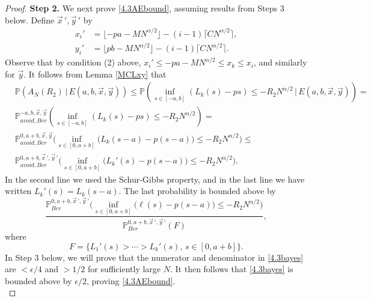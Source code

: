 \begin{proof}
		\noindent\textbf{Step 2.} We next prove \eqref{4.3AEbound}, assuming results from Steps 3 below. Define $\vec{x}\,',\vec{y}\,'$ by
		\begin{align*}
		x_i' &= \lfloor - pa - MN^{\alpha/2}\rfloor - (i-1)\lceil CN^{\alpha/2}\rceil,\\
		y_i' &= \lfloor pb - MN^{\alpha/2}\rfloor - (i-1)\lceil CN^{\alpha/2}\rceil.
		\end{align*}  
		Observe that by condition (2) above, $x_i'\leq -pa - MN^{\alpha/2} \leq x_k \leq x_i$, and similarly for $\vec{y}$. It follows from Lemma \ref{MCLxy} that
		\begin{equation}\label{4.3main}
		\begin{split}
		&\mathbb{P}(A_N(R_2)\,|\,E(a,b,\vec{x},\vec{y})) \leq \mathbb{P}\left( \inf_{s\in[-a, b]} \left(L_k(s) - ps\right) \leq -R_2N^{\alpha/2}\, \big| \, E(a,b,\vec{x},\vec{y}) \right) = \\
		&\mathbb{P}^{-a,b, \vec{x}, \vec{y}}_{avoid, Ber} \left( \inf_{s\in[-a, b]} \left(L_k(s) - ps\right) \leq -R_2N^{\alpha/2} \right) =\\
		& \mathbb{P}^{0, a+b, \vec{x}, \vec{y}}_{avoid, Ber} \Big( \inf_{s\in[0,a+b]} \big(L_k(s-a) - p(s-a)\big) \leq -R_2N^{\alpha/2} \Big) \leq \\
		& \mathbb{P}^{0, a+b, \vec{x}\,', \vec{y}\,'}_{avoid, Ber} \Big( \inf_{s\in[0,a+b]} \big(L_k'(s) - p(s-a)\big) \leq -R_2N^{\alpha/2} \Big).
		\end{split}
		\end{equation}
		In the second line we used the Schur-Gibbs property, and in the last line we have written $L_k'(s) = L_k(s-a)$. The last probability is bounded above by
		\begin{equation}\label{4.3bayes}
		\frac{\mathbb{P}^{0, a+b, \vec{x}\,', \vec{y}\,'}_{Ber} \Big( \inf_{s\in[0,a+b]} \big(\ell(s) - p(s-a)\big) \leq -R_2 N^{\alpha/2} \Big)}{\mathbb{P}^{0, a+b, \vec{x}\,', \vec{y}\,'}_{Ber}(F)},
		\end{equation}
		where
		\[
		F = \{L_1'(s) > \cdots > L_k'(s), \,s\in [0, a+b]\}.
		\]
		In Step 3 below, we will prove that the numerator and denominator in \eqref{4.3bayes} are $<\epsilon/4$ and $>1/2$ for sufficiently large $N$. It then follows that \eqref{4.3bayes} is bounded above by $\epsilon/2$, proving \eqref{4.3AEbound}.\\
		

\end{proof}
